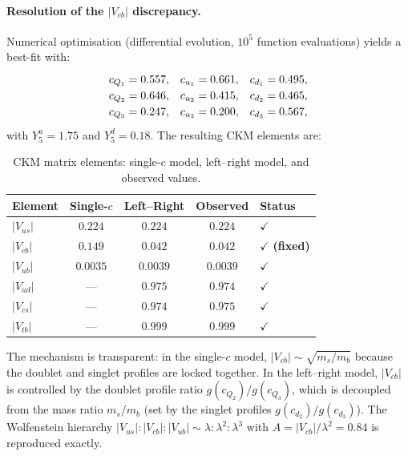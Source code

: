 \paragraph{Resolution of the $|V_{cb}|$ discrepancy.} Numerical optimisation (differential evolution, $10^5$ function evaluations) yields a best-fit with:
\begin{equation}
\renewcommand{\arraystretch}{1.2}
\begin{array}{@{}lll@{}}
  c_{Q_1} = 0.557, & c_{u_1} = 0.661, & c_{d_1} = 0.495, \\
  c_{Q_2} = 0.646, & c_{u_2} = 0.415, & c_{d_2} = 0.465, \\
  c_{Q_3} = 0.247, & c_{u_3} = 0.200, & c_{d_3} = 0.567,
\end{array}
\label{eq:4-LR-bestfit}
\end{equation}
with $Y_5^u = 1.75$ and $Y_5^d = 0.18$. The resulting CKM elements are:

\begin{table}[htbp]
\centering
\caption{CKM matrix elements: single-$c$ model, left--right model, and observed values.}
\label{tab:4-ckm-LR}
\small
\begin{tabular}{@{}lcccl@{}}
\toprule
Element & Single-$c$ & Left--Right & Observed & Status \\
\midrule
$|V_{us}|$ & $0.224$ & $0.224$ & $0.224$ & $\checkmark$ \\
$|V_{cb}|$ & $0.149$ & $\mathbf{0.042}$ & $0.042$ & $\checkmark$ \textbf{(fixed)} \\
$|V_{ub}|$ & $0.0035$ & $0.0039$ & $0.0039$ & $\checkmark$ \\
\midrule
$|V_{ud}|$ & --- & $0.975$ & $0.974$ & $\checkmark$ \\
$|V_{cs}|$ & --- & $0.974$ & $0.975$ & $\checkmark$ \\
$|V_{tb}|$ & --- & $0.999$ & $0.999$ & $\checkmark$ \\
\bottomrule
\end{tabular}
\end{table}

The mechanism is transparent: in the single-$c$ model, $|V_{cb}| \sim \sqrt{m_s/m_b}$ because the doublet and singlet profiles are locked together. In the left--right model, $|V_{cb}|$ is controlled by the doublet profile ratio $g(c_{Q_2})/g(c_{Q_3})$, which is decoupled from the mass ratio $m_s/m_b$ (set by the singlet profiles $g(c_{d_2})/g(c_{d_3})$). The Wolfenstein hierarchy $|V_{us}| : |V_{cb}| : |V_{ub}| \sim \lambda : \lambda^2 : \lambda^3$ with $A = |V_{cb}|/\lambda^2 = 0.84$ is reproduced exactly.

